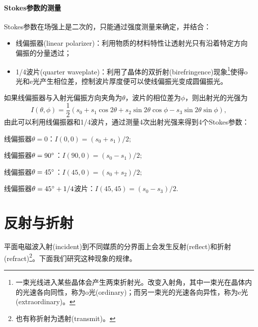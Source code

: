 \paragraph{Stokes参数的测量}
Stokes参数在场强上是二次的，只能通过强度测量来确定，并结合：
\begin{itemize}
    \item 线偏振器(linear polarizer)：利用物质的材料特性让透射光只有沿着特定方向偏振的分量透过；
    \item 1/4波片(quarter waveplate)：利用了晶体的双折射(birefringence)现象\footnote{一束光线进入某些晶体会产生两束折射光。改变入射角，其中一束光在晶体内的光速各向同性，称为o光(ordinary)；而另一束光的光速各向异性，称为e光(extraordinary)。}使得o光和e光产生相位差，控制波片厚度便可以使线偏振光变成圆偏振光。
\end{itemize}
如果线偏振器与入射光偏振方向夹角为$\theta$，波片的相位差为$\phi$，则出射光的光强为
\[
    I(\theta,\phi)=\frac12(s_0+s_1\cos2\theta+s_2\sin2\theta\cos\phi-s_3\sin2\theta\sin\phi),
\]
由此可以利用线偏振器和1/4波片，通过测量4次出射光强来得到4个Stokes参数：
\begin{compactitem}
	\item 线偏振器$\theta=0$：$I(0,0)=(s_0+s_1)/2;$
    \item 线偏振器$\theta=90^\circ$：$I(90,0)=(s_0-s_1)/2;$
    \item 线偏振器$\theta=45^\circ$：$I(45,0)=(s_0+s_2)/2;$
    \item 线偏振器$\theta=45^\circ+1/4$波片：$I(45,45)=(s_0-s_3)/2.$
\end{compactitem}
\section{反射与折射}
平面电磁波入射(incident)到不同媒质的分界面上会发生反射(reflect)和折射(refract)\footnote{也有称折射为透射(transmit)。}。下面我们研究这种现象的规律。
\begin{center}
\end{center}


